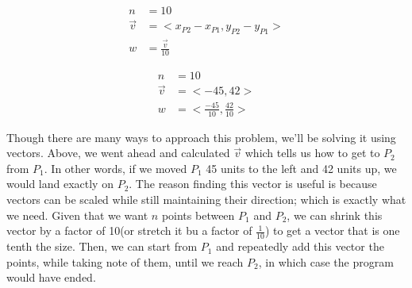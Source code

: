 \documentclass[14pt]{article}
\begin{document}
\begin{figure}[H]
	\begin{center}
		\begin{minipage}[b]{0.48\textwidth}
			\centering	
			$$
				\begin{aligned}
					n &= 10 \\
					\overrightarrow{v} &= <x_{P2} - x_{P1}, y_{P2} - y_{P1}> \\
					w &= \frac{\overrightarrow{v}}{10}
				\end{aligned}
			$$
		\end{minipage}
		\hfill
		\begin{minipage}[b]{0.48\textwidth}
			\centering
			$$
				\begin{aligned}
					n &= 10 \\
					\overrightarrow{v} &= <-45, 42> \\
					w &= <\frac{-45}{10}, \frac{42}{10}>
				\end{aligned}
			$$
		\end{minipage}
	\end{center}
\end{figure}

Though there are many ways to approach this problem, we'll be solving it using vectors. Above, we went ahead and calculated $\overrightarrow{v}$ which tells us how to get to $P_2$ from $P_1$. In other words, if we moved $P_1$ 45 units to the left and 42 units up, we would land exactly on $P_2$. The reason finding this vector is useful is because vectors can be scaled while still maintaining their direction; which is exactly what we need. Given that we want $n$ points between $P_1$ and $P_2$, we can shrink this vector by a factor of 10(or stretch it bu a factor of $\frac{1}{10}$) to get a vector that is one tenth the size. Then, we can start from $P_1$ and repeatedly add this vector the points, while taking note of them, until we reach $P_2$, in which case the program would have ended.

\vspace{1em}
\end{document}
